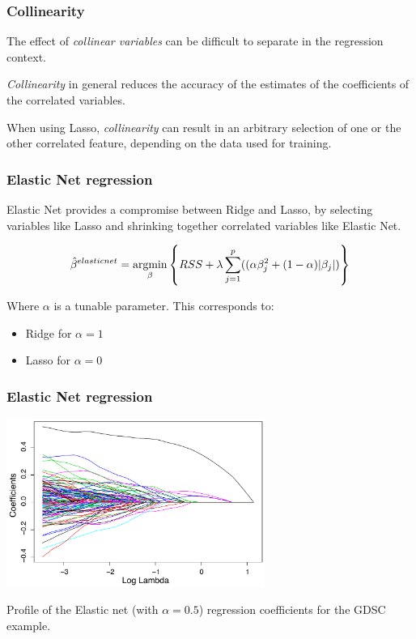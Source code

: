 \documentclass[notes]{beamer}          %
\newcommand{\argmin}{\operatornamewithlimits{argmin}}
\begin{document}
\begin{frame}
\frametitle{Collinearity}
The effect of \textit{collinear variables} can be difficult to separate in the regression context.

\vspace{5mm} 

\textit{Collinearity} in general reduces the accuracy of the estimates of the coefficients of the correlated variables.

\vspace{5mm} 

When using Lasso, \textit{collinearity} can result in an arbitrary selection of one or the other correlated feature, depending on the data used for training.
\end{frame}

\begin{frame}
\frametitle{Elastic Net regression}

Elastic Net provides a compromise between Ridge and Lasso, by selecting variables like Lasso and shrinking together correlated variables like Elastic Net.


\begin{equation*}
    \hat{\beta}^{elastic net} =  \argmin_{\beta} \left\{ RSS + \lambda \sum_{j=1}^p ((\alpha \beta_j^2 + (1-\alpha)| \beta_j |) \right\}
\end{equation*}

Where $\alpha$ is a tunable parameter. This corresponds to:

\begin{itemize}
    \item Ridge for $\alpha=1$
    \item Lasso for $\alpha=0$
\end{itemize}

\end{frame}

\begin{frame}
\frametitle{Elastic Net regression}

\begin{center}
\includegraphics[height=5.5cm]{../figures/week_2_linear_models/ElasticNet_regression_coefficinets.pdf}
\end{center}

Profile of the Elastic net (with $\alpha=0.5$) regression coefficients for the GDSC example.

\end{frame}
\end{document}
